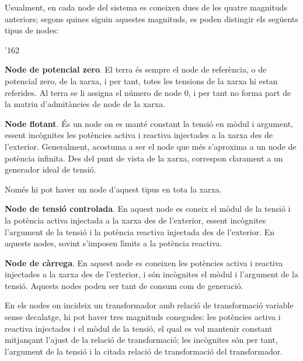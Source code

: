 Usualment, en cada node del sistema es coneixen dues de les quatre magnituds anteriors;
segons quines siguin aquestes magnituds, es poden distingir els seg\"{u}ents tipus de nodes:
\begin{dinglist}{'162}
    \item \textbf{Node de potencial zero}. El terra \'{e}s sempre el node de refer\`{e}ncia, o de potencial zero, de la
    xarxa, i per tant, totes les tensions de la xarxa hi estan referides. Al terra se li
    assigna el n\'{u}mero de node 0, i per tant no forma part de la matriu d'admit\`{a}ncies de node de la xarxa.

   \item \textbf{Node flotant}. \'{E}s un node on es mant\'{e} constant la tensi\'{o} en m\`{o}dul i argument,
   essent inc\`{o}gnites les pot\`{e}ncies activa i reactiva injectades a la xarxa des de l'exterior.
    Generalment, acostuma a ser el node que m\'{e}s s'aproxima a un node de pot\`{e}ncia infinita. Des del
    punt de vista de la xarxa, correspon clarament a un generador ideal de tensi\'{o}.

Nom\'{e}s hi pot haver un node d'aquest tipus en tota la xarxa.
   \item \textbf{Node de tensi\'{o} controlada}. En aquest node es coneix el m\`{o}dul de la tensi\'{o} i la
   pot\`{e}ncia activa injectada a la xarxa des de l'exterior, essent inc\`{o}gnites l'argument de la tensi\'{o} i la pot\`{e}ncia
   reactiva injectada des de l'exterior. En aquests nodes, sovint s'imposen l\'{\i}mits a la pot\`{e}ncia reactiva.

   \item \textbf{Node de c\`{a}rrega}. En aquest node es coneixen les pot\`{e}ncies activa i reactiva
   injectades a la xarxa des de l'exterior, i s\'{o}n inc\`{o}gnites el m\`{o}dul i l'argument de la tensi\'{o}.
   Aquests nodes poden ser tant de consum com de generaci\'{o}.

En els nodes on incideix un transformador amb relaci\'{o} de transformaci\'{o} variable sense decalatge, hi pot
haver tres magnituds conegudes: les pot\`{e}ncies activa i reactiva injectades i el m\`{o}dul de
la tensi\'{o}, el qual es vol mantenir constant mitjan\c{c}ant l'ajust de la relaci\'{o} de
transformaci\'{o}; les inc\`{o}gnites s\'{o}n per tant, l'argument de la tensi\'{o} i la citada relaci\'{o} de
transformaci\'{o} del transformador.
\end{dinglist}


